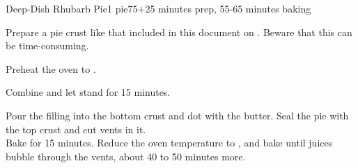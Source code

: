 \documentclass[../Cookbook.tex]{subfiles}
\begin{document}
\begin{recipe}{Deep-Dish Rhubarb Pie}{1 pie}{75+25 minutes prep, 55-65 minutes baking}

	Prepare a pie crust like that included in this document on . Beware that this can be time-consuming.

	\newstep
	Preheat the oven to .

	Combine and let stand for 15 minutes.

	Pour the filling into the bottom crust and dot with the butter. Seal the pie with the top crust and cut vents in it.\\
	Bake for 15 minutes.
	Reduce the oven temperature to , and bake until juices bubble through the vents, about 40 to 50 minutes more.

\end{recipe}
\end{document}
